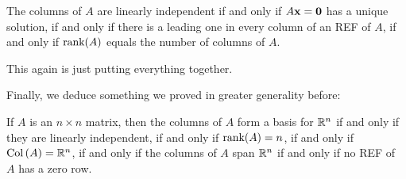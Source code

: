 \begin{fac} The columns of $A$ are linearly independent if and only if
$A\mathbf{x}=\mathbf{0}$ has a unique solution, if and only if there is a leading one
in every column of an REF of $A$, if and only if $\textrm{rank}(A)$ equals
the number of columns of $A$.\end{fac}

This again is just putting everything together.

Finally, we deduce something we proved in greater generality before:

\begin{fac} If $A$ is an $n\times n$ matrix, then the columns of $A$ form
a basis for $\mathbb{R}^n$ if and only if they are linearly independent, if
and only if $\textrm{rank}(A)=n$, if and only if $\operatorname{Col\,}(A)=\mathbb{R}^n$, if and only
if the columns of $A$ span $\mathbb{R}^n$ if and only if no REF of $A$ has
a zero row.\end{fac}



